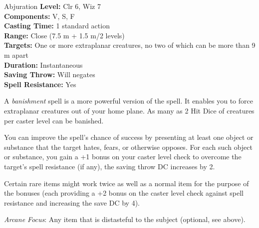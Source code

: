 {Abjuration}
{
	\textbf{Level:}
	Clr 6, Wiz 7\\
	\textbf{Components:}
	V, S, F\\
	\textbf{Casting Time:}
	1 standard action\\
	\textbf{Range:}
	Close (7.5 m + 1.5 m/2 levels)\\
	\textbf{Targets:}
	One or more extraplanar creatures, no two of which can be more than 9 m apart\\
	\textbf{Duration:}
	Instantaneous\\
	\textbf{Saving Throw:}
	Will negates\\
	\textbf{Spell Resistance:}
	Yes\\
}
{
	A \emph{banishment} spell is a more powerful version of the  spell. It enables you to force extraplanar creatures out of your home plane. As many as 2 Hit Dice of creatures per caster level can be banished.

	You can improve the spell's chance of success by presenting at least one object or substance that the target hates, fears, or otherwise opposes. For each such object or substance, you gain a +1 bonus on your caster level check to overcome the target's spell resistance (if any), the saving throw DC increases by 2.

	Certain rare items might work twice as well as a normal item for the purpose of the bonuses (each providing a +2 bonus on the caster level check against spell resistance and increasing the save DC by 4).

	\textit{Arcane Focus}:
	Any item that is distasteful to the subject (optional, see above).

}
